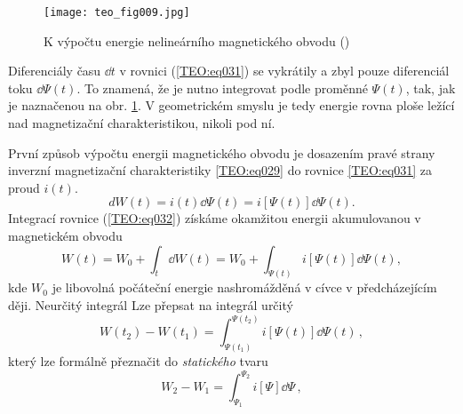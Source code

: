 {      \begin{figure}[ht!] %
        \centering
        \texttt{[image: teo\_fig009.jpg]}
        \caption{K výpočtu energie nelineárního magnetického obvodu
                 (\cite[s.~158]{Patocka4})}
        \label{teo:fig009}
      \end{figure}
      Diferenciály času \(\dd{t}\) v rovnici (\ref{TEO:eq031}) se vykrátily a zbyl pouze 
      diferenciál toku \(\dd{\Psi(t)}\). To znamená, že je nutno integrovat podle proměnné 
      \(\Psi(t)\), tak, jak je naznačenou na obr. \ref{teo:fig009}. V geometrickém smyslu je tedy 
      energie rovna ploše ležící nad magnetizační charakteristikou, nikoli pod ní.

      První způsob výpočtu energii magnetického obvodu je dosazením pravé strany 
      inverzní magnetizační charakteristiky \ref{TEO:eq029} do rovnice \ref{TEO:eq031} za proud 
      \(i(t)\). 
      \begin{equation}\label{TEO:eq032}
        dW(t) = i(t)\dd{\Psi(t)} = i[\Psi(t)]\dd{\Psi(t)}.
      \end{equation}
      Integrací rovnice (\ref{TEO:eq032}) získáme okamžitou energii akumulovanou v magnetickém 
      obvodu
      \begin{equation}\label{TEO:eq033}
        W(t) = W_0 + \int_t\dd{W(t)} = W_0 + \int_{\Psi(t)}i[\Psi(t)]\dd{\Psi(t)},
      \end{equation}
      kde \(W_0\) je libovolná počáteční energie nashromážděná v cívce v předcházejícím ději. 
      Neurčitý integrál Lze přepsat na integrál určitý
      \begin{equation}\label{TEO:eq034}
        \boxed{W(t_2) - W(t_1)  = \int_{\Psi(t_1)}^{\Psi(t_2)}i[\Psi(t)]\dd{\Psi(t)}}\,,
      \end{equation}
      který lze formálně přeznačit do \emph{statického} tvaru
      \begin{equation}\label{TEO:eq035}
        \boxed{W_2 - W_1  = \int_{\Psi_1}^{\Psi_2}i[\Psi]\dd{\Psi}}\,,
      \end{equation}
      
}
